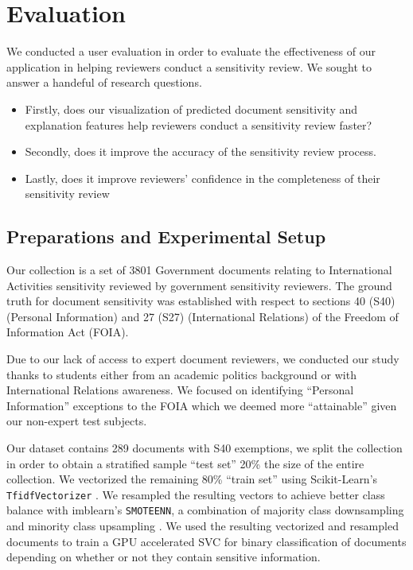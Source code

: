 \documentclass{l4proj}
\begin{document}
\chapter{Evaluation}

We conducted a user evaluation in order to evaluate the effectiveness of our application in helping reviewers conduct a sensitivity review. We sought to answer a handeful of research questions.

\begin{itemize}
    \item Firstly, does our visualization of predicted document sensitivity and explanation features help reviewers conduct a sensitivity review faster?
    \item Secondly, does it improve the accuracy of the sensitivity review process.
    \item Lastly, does it improve reviewers' confidence in the completeness of their sensitivity review
\end{itemize}

\section{Preparations and Experimental Setup}

Our collection is a set of 3801 Government documents relating to International Activities sensitivity reviewed by government sensitivity reviewers.
The ground truth for document sensitivity was established with respect to sections 40 (S40) (Personal Information) and 27 (S27) (International Relations) of the Freedom of Information Act (FOIA).

Due to our lack of access to expert document reviewers, we conducted our study thanks to students either from an academic politics background or with International Relations awareness.
We focused on identifying ``Personal Information'' exceptions to the FOIA which we deemed more ``attainable'' given our non-expert test subjects.

Our dataset contains 289 documents with S40 exemptions, we split the collection in order to obtain a stratified sample ``test set'' 20\% the size of the entire collection.
We vectorized the remaining 80\% ``train set'' using Scikit-Learn's \verb|TfidfVectorizer| \autocite{pedregosaScikitlearnMachineLearning2011}.
We resampled the resulting vectors to achieve better class balance with imblearn's \verb|SMOTEENN|, a combination of majority class downsampling and minority class upsampling \autocite{lemaitreImbalancedlearnPythonToolbox2017}.
We used the resulting vectorized and resampled documents to train a GPU accelerated SVC \autocite{wenThunderSVMFastSVM2018} for binary classification of documents depending on whether or not they contain sensitive information.
\end{document}
